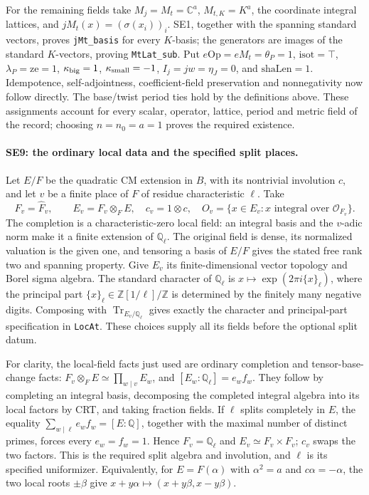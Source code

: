 For the remaining fields take $M_j=M_t=\mathbb C^a$,
$M_{t,K}=K^a$, the coordinate integral lattices, and
$jM_t(x)=(\sigma(x_i))_i$. SE1, together with the spanning standard
vectors, proves \texttt{jMt\_basis} for every $K$-basis; the generators
are images of the standard $K$-vectors, proving \texttt{MtLat\_sub}.
Put $e\mathrm{Op}=eM_t=\theta_P=1$, $\mathrm{isot}=\top$,
$\lambda_P=\mathrm{ze}=1$, $\kappa_{\rm big}=1$,
$\kappa_{\rm small}=-1$, $I_j=jw=\eta_J=0$, and
$\mathrm{shaLen}=1$. Idempotence, self-adjointness, coefficient-field
preservation and nonnegativity now follow directly. The base/twist
period ties hold by the definitions above. These assignments account
for every scalar, operator, lattice, period and metric field of the
record; choosing $n=n_0=a=1$ proves the required existence.

\paragraph{SE9: the ordinary local data and the specified split places.}
Let $E/F$ be the quadratic CM extension in $B$, with its nontrivial
involution $c$, and let $v$ be a finite place of $F$ of residue
characteristic $\ell$. Take
\[
 F_v=\widehat F_v,\qquad E_v=F_v\otimes_F E,
 \quad c_v=1\otimes c,
 \quad O_v=\{x\in E_v:x\text{ integral over }\mathcal O_{F_v}\}.
 \tag{SE.13}
\]
The completion is a characteristic-zero local field: an integral basis
and the $v$-adic norm make it a finite extension of $\mathbb Q_\ell$.
The original field is dense, its normalized valuation is the given
one, and tensoring a basis of $E/F$ gives the stated free rank two and
spanning property. Give $E_v$ its finite-dimensional vector topology
and Borel sigma algebra. The standard character of $\mathbb Q_\ell$
is $x\mapsto\exp(2\pi i\{x\}_\ell)$, where the principal part
$\{x\}_\ell\in\mathbb Z[1/\ell]/\mathbb Z$ is determined by the
finitely many negative digits. Composing with
$\operatorname{Tr}_{E_v/\mathbb Q_\ell}$ gives exactly the character
and principal-part specification in \texttt{LocAt}. These choices
supply all its fields before the optional split datum.

For clarity, the local-field facts just used are ordinary completion
and tensor-base-change facts: $F_v\otimes_FE\simeq\prod_{w\mid v}E_w$,
and $[E_w:\mathbb Q_\ell]=e_wf_w$. They follow by completing an
integral basis, decomposing the completed integral algebra into its
local factors by CRT, and taking fraction fields. If $\ell$ splits
completely in $E$, the equality
$\sum_{w\mid\ell}e_wf_w=[E:\mathbb Q]$, together with the maximal
number of distinct primes, forces every $e_w=f_w=1$. Hence
$F_v=\mathbb Q_\ell$ and $E_v\simeq F_v\times F_v$; $c_v$ swaps
the two factors. This is the required split algebra and involution,
and $\ell$ is its specified uniformizer. Equivalently, for
$E=F(\alpha)$ with $\alpha^2=a$ and $c\alpha=-\alpha$, the two local
roots $\pm\beta$ give $x+y\alpha\mapsto(x+y\beta,x-y\beta)$.

